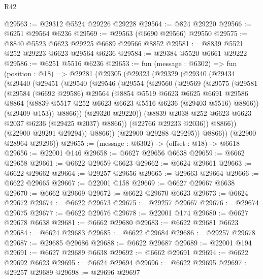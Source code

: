 \begin{lexlean}{R42}
\begin{coremodule}
{@29563 := @29312 @5524 @29226 @29228
@29564 := @824 @29220
@29566 := @6251 @29564 @6236
@29569 := @29563 (@6690 @29566) @29550
@29575 := @8840 @5523 @6623 @29225 @6689 @29566 @8852
@29581 := @8839 @5521 @252 @29223 @6623 @29564 @6236
@29584 := @29384 @5520 @6661 @29222
@29586 := @6251 @5516 @6236
@29653 := fun (message : @6302) =>
  fun (position : @18) =>
  @29281
    (@29305
      (@29323
        (@29329
          (@29340
            (@29434
              (@29440
                (@29451
                  (@29540
                    (@29546
                      (@29554
                        (@29560
                          (@29569
                            (@29575
                              (@29581
                                (@29584
                                  (@6692 @29586)
                                  @29564
                                  (@8854
                                    @5519
                                    @6623
                                    @6625
                                    @6691
                                    @29586
                                    @8864
                                    (@8839 @5517 @252 @6623 @6623 @5516 @6236 (@29403 @5516) @8866))
                                  (@29409 @153))
                                @8866))
                            (@29320 @29220))
                          (@8839 @2038 @252 @6623 @6623 @2037 @6236 (@29425 @2037) @8866))
                        (@22766 @29233 @2036))
                      @8866))
                  (@22900 @29291 @29294))
                @8866))
            (@22900 @29288 @29295))
          @8866))
      (@22900 @28964 @29296))
@29655 := (message : @6302) -> (offset : @18) -> @6618
@29656 := @22001 @146
@29658 := @6627 @29656 @6638
@29659 := @6662 @29658
@29661 := @6622 @29659 @6623
@29662 := @6624 @29661
@29663 := @6622 @29662
@29664 := @29257 @29656
@29665 := @29663 @29664
@29666 := @6622 @29665
@29667 := @22001 @158
@29669 := @6627 @29667 @6638
@29670 := @6662 @29669
@29672 := @6622 @29670 @6623
@29673 := @6624 @29672
@29674 := @6622 @29673
@29675 := @29257 @29667
@29676 := @29674 @29675
@29677 := @6622 @29676
@29678 := @22001 @174
@29680 := @6627 @29678 @6638
@29681 := @6662 @29680
@29683 := @6622 @29681 @6623
@29684 := @6624 @29683
@29685 := @6622 @29684
@29686 := @29257 @29678
@29687 := @29685 @29686
@29688 := @6622 @29687
@29689 := @22001 @194
@29691 := @6627 @29689 @6638
@29692 := @6662 @29691
@29694 := @6622 @29692 @6623
@29695 := @6624 @29694
@29696 := @6622 @29695
@29697 := @29257 @29689
@29698 := @29696 @29697
}
\end{coremodule}
\end{lexlean}
